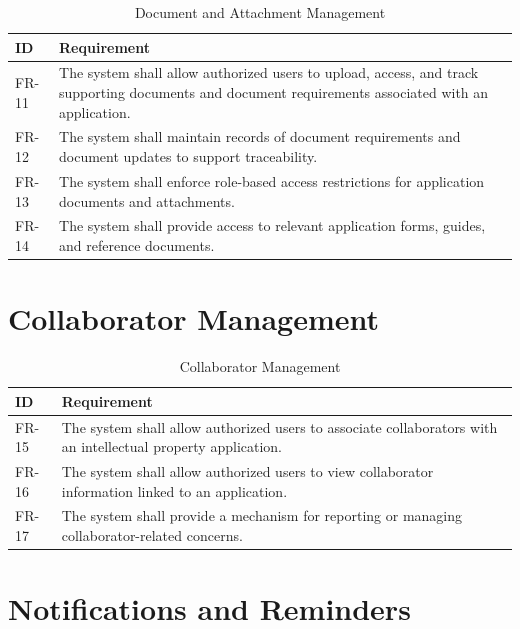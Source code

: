 \begin{table}[H]
\centering
\small
\caption{Document and Attachment Management}
\label{tab:fr_document_management}
\begin{tabular}{|p{2.2cm}|p{12cm}|}
\hline
\textbf{ID} & \textbf{Requirement} \\
\hline
FR-11 & The system shall allow authorized users to upload, access, and track supporting documents and document requirements associated with an application. \\
\hline
FR-12 & The system shall maintain records of document requirements and document updates to support traceability. \\
\hline
FR-13 & The system shall enforce role-based access restrictions for application documents and attachments. \\
\hline
FR-14 & The system shall provide access to relevant application forms, guides, and reference documents. \\
\hline
\end{tabular}
\end{table}

\section{Collaborator Management}

\begin{table}[H]
\centering
\small
\caption{Collaborator Management}
\label{tab:fr_collaborator_management}
\begin{tabular}{|p{2.2cm}|p{12cm}|}
\hline
\textbf{ID} & \textbf{Requirement} \\
\hline
FR-15 & The system shall allow authorized users to associate collaborators with an intellectual property application. \\
\hline
FR-16 & The system shall allow authorized users to view collaborator information linked to an application. \\
\hline
FR-17 & The system shall provide a mechanism for reporting or managing collaborator-related concerns. \\
\hline
\end{tabular}
\end{table}

\section{Notifications and Reminders}

